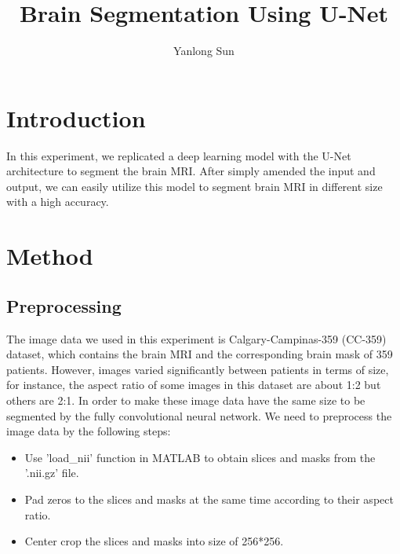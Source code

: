 \documentclass[10pt]{article}
\author{Yanlong Sun}
\title{Brain Segmentation Using U-Net}
\begin{document}
\maketitle



\section{Introduction}
In this experiment, we replicated a deep learning model with the U-Net architecture \cite{buda} to segment the brain MRI. After simply amended the input and output, we can easily utilize this model to segment brain MRI in different size with a high accuracy.


\section{Method}

\subsection{Preprocessing}
The image data we used in this experiment is Calgary-Campinas-359 \cite{dataset}(CC-359) dataset, which contains the brain MRI and the corresponding brain mask of 359 patients. However, images varied significantly between patients in terms of size, for instance, the aspect ratio of some images in this dataset are about 1:2 but others are 2:1. In order to make these image data have the same size to be segmented by the fully convolutional neural network. We need to preprocess the image data by the following steps:
\begin{itemize}
	\item Use 'load\_nii' function in MATLAB to obtain slices and masks from the '.nii.gz' file.
	\item Pad zeros to the slices and masks at the same time according to their aspect ratio.
	\item Center crop the slices and masks into size of 256*256.
\end{itemize} 
\end{document}
